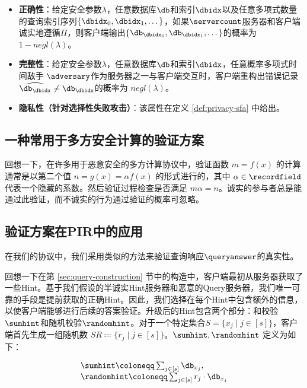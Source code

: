 \begin{definition}
    \begin{itemize}
        \item \textbf{正确性}：给定安全参数$\lambda$，任意数据库$\db$和索引$\dbidx$以及任意多项式数量的查询索引序列$\{\dbidx_0,\dbidx_1, \dots\}$，如果$\servercount$服务器和客户端诚实地遵循$\Pi$，则客户端输出$\{\db_{\dbidx_0},\db_{\dbidx_1}, \dots\}$的概率为$1-negl(\lambda)$。
        \item \textbf{完整性}：给定安全参数$\lambda$，任意数据库$\db$和索引$\dbidx$，任意概率多项式时间敌手 $\adversary$作为服务器之一与客户端交互时，客户端重构出错误记录$\widehat{\db_\dbidx} \neq \db_\dbidx$的概率为 $negl(\lambda)$。
        \item \textbf{隐私性（针对选择性失败攻击）}：该属性在定义 \ref{def:privacy-sfa} 中给出。
    \end{itemize}
\end{definition}
\subsection{一种常用于多方安全计算的验证方案}
回想一下，在许多用于恶意安全的多方计算协议中，验证函数 $m = f(x)$ 的计算通常是以第二个值 $n = g(x) = \alpha f(x)$ 的形式进行的，其中 $\alpha \in \recordfield$ 代表一个隐藏的系数。然后验证过程检查是否满足 $m\alpha = n$。诚实的参与者总是能通过此验证，而不诚实的行为通过验证的概率可忽略。

\subsection{验证方案在PIR中的应用}

在我们的协议中，我们采用类似的方法来验证查询响应$\queryanswer$的真实性。

回想一下在第 \ref{sec:query-construction} 节中的构造中，客户端最初从服务器获取了一些Hint。基于我们假设的半诚实Hint服务器和恶意的Query服务器，我们唯一可靠的手段是提前获取的正确Hint。因此，我们选择在每个Hint中包含额外的信息，以使客户端能够进行后续的答案验证。升级后的Hint包含两个部分：和校验$\sumhint$和随机校验$\randomhint$。对于一个特定集合$S = \{x_j \mid j\in [s]\}$，客户端首先生成一组随机数 $SR\coloneqq \{r_j \mid j\in [s]\}$。$\sumhint, \randomhint$ 定义为如下：

$$
    \begin{array}{l}
        \sumhint \coloneqq  \sum_{j \in [s]} \db_{x_j}, \\
        \randomhint \coloneqq  \sum_{j \in [s]} r_j\cdot \db_{x_j}
    \end{array}
$$

